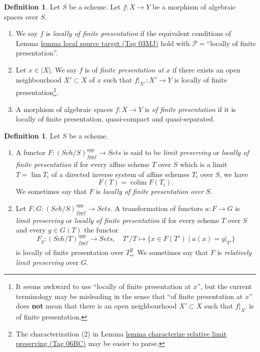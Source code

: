 \documentclass{amsart}
\theoremstyle{plain}
\theoremstyle{definition}
\newtheorem{definition}[subsection]{Definition}
\theoremstyle{remark}
\numberwithin{equation}{subsection}
\def\lim{\mathop{\mathrm{lim}}\nolimits}
\def\colim{\mathop{\mathrm{colim}}\nolimits}
\def\Sch{\mathit{Sch}}
\begin{document}
\begin{definition}
\label{spaces-morphisms-definition-locally-finite-presentation}
Let $S$ be a scheme.
Let $f : X \to Y$ be a morphism of algebraic spaces over $S$.
\begin{enumerate}
\item We say $f$ is {\it locally of finite presentation} if
the equivalent conditions of
Lemma \href{https://stacks.math.columbia.edu/tag/03MJ}{lemma local source target (Tag 03MJ)}
hold with $\mathcal{P} =$``locally of finite presentation''.
\item Let $x \in |X|$. We say $f$ is of {\it finite presentation at $x$}
if there exists an open neighbourhood $X' \subset X$ of $x$ such
that $f|_{X'} : X' \to Y$ is locally of finite
presentation\footnote{It seems awkward to use ``locally of finite presentation
at $x$'', but the current terminology may be misleading in the sense that
``of finite presentation at $x$'' does {\bf not} mean that there is
an open neighbourhood $X' \subset X$ such that $f|_{X'}$ is of finite
presentation.}.
\item A morphism of algebraic spaces $f : X \to Y$ is
{\it of finite presentation}
if it is locally of finite presentation, quasi-compact and
quasi-separated.
\end{enumerate}
\end{definition}

\begin{definition}
\label{definition-locally-finite-presentation}
Let $S$ be a scheme.
\begin{enumerate}
\item A functor $F : (\Sch/S)_{fppf}^{opp} \to \textit{Sets}$
is said to be {\it limit preserving} or {\it locally of finite presentation} if
for every affine scheme $T$ over $S$ which is a limit $T = \lim T_i$
of a directed inverse system of affine schemes $T_i$ over $S$, we have
$$
F(T) = \colim F(T_i).
$$
We sometimes say that $F$ is {\it locally of finite presentation over $S$}.
\item Let $F, G : (\Sch/S)_{fppf}^{opp} \to \textit{Sets}$.
A transformation of functors $a : F \to G$
is {\it limit preserving} or {\it locally of finite presentation}
if for every scheme $T$ over $S$ and every $y \in G(T)$ the functor
$$
F_y : (\Sch/T)_{fppf}^{opp} \longrightarrow \textit{Sets}, \quad
T'/T \longmapsto \{x \in F(T') \mid a(x) = y|_{T'}\}
$$
is locally of finite presentation over $T$\footnote{The characterization (2) in
Lemma \href{https://stacks.math.columbia.edu/tag/06BC}{lemma characterize relative limit preserving (Tag 06BC)}
may be easier to parse.}. We sometimes say that
$F$ is {\it relatively limit preserving} over $G$.
\end{enumerate}
\end{definition}
\end{document}
